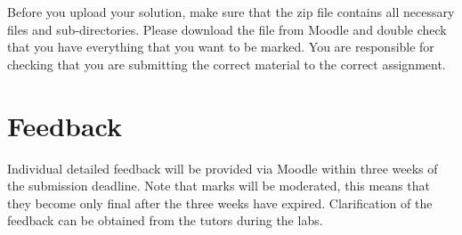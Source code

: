 \documentclass[12pt, oneside]{article}   	%
\begin{document}
Before you upload your solution, make sure that the zip file contains all necessary files and sub-directories. Please download the file from Moodle and double check that you have everything that you want to be marked. You are responsible for checking that you are submitting the correct material to the correct assignment.

\section{Feedback}
Individual detailed feedback will be provided via Moodle within three weeks of the submission deadline. Note that marks will be moderated, this means that they become only final after the three weeks have expired. Clarification of the feedback can be obtained from the tutors during the labs.
\end{document}
